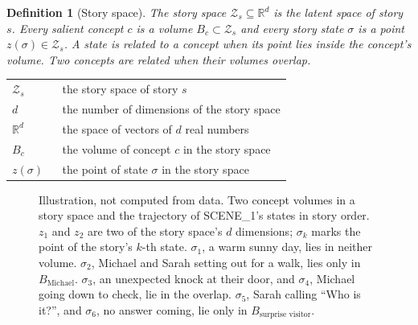 \documentclass[11pt]{article}
\makeatletter
\newtheorem{definition}{Definition}
\theoremstyle{remark}
\newcommand{\R}{\mathbb{R}}
\newenvironment{symbols}
  {\par\smallskip\noindent\small\begin{tabular}{@{}>{$}l<{$}@{\quad}p{0.82\linewidth}@{}}}
  {\end{tabular}\par\medskip}
\makeatother
\begin{document}
\begin{definition}[Story space]
The story space $\mathcal{Z}_s \subseteq \R^d$ is the latent space of story $s$. Every salient concept $c$ is a volume $B_c \subset \mathcal{Z}_s$ and every story state $\sigma$ is a point $z(\sigma) \in \mathcal{Z}_s$. A state is related to a concept when its point lies inside the concept's volume. Two concepts are related when their volumes overlap.
\end{definition}
\begin{symbols}
\mathcal{Z}_s & the story space of story $s$ \\
d & the number of dimensions of the story space \\
\R^d & the space of vectors of $d$ real numbers \\
B_c & the volume of concept $c$ in the story space \\
z(\sigma) & the point of state $\sigma$ in the story space \\
\end{symbols}

\begin{figure}[ht]
\centering
{}
\caption{Illustration, not computed from data. Two concept volumes in a story space and the trajectory of SCENE\_1's states in story order. $z_1$ and $z_2$ are two of the story space's $d$ dimensions; $\sigma_k$ marks the point of the story's $k$-th state. $\sigma_1$, a warm sunny day, lies in neither volume. $\sigma_2$, Michael and Sarah setting out for a walk, lies only in $B_{\text{Michael}}$. $\sigma_3$, an unexpected knock at their door, and $\sigma_4$, Michael going down to check, lie in the overlap. $\sigma_5$, Sarah calling ``Who is it?'', and $\sigma_6$, no answer coming, lie only in $B_{\text{surprise visitor}}$.}
\label{fig:story-space}
\end{figure}
\end{document}
